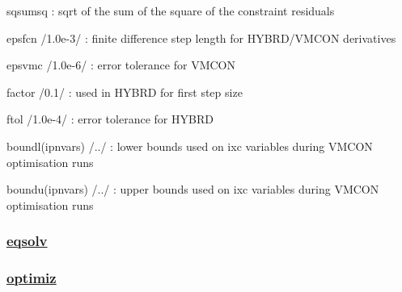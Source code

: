 \documentclass[]{article}
\begin{document}
sqsumsq : sqrt of the sum of the square of the constraint residuals

epsfcn /1.0e-3/ : finite difference step length for HYBRD/VMCON
derivatives

epsvmc /1.0e-6/ : error tolerance for VMCON

factor /0.1/ : used in HYBRD for first step size

ftol /1.0e-4/ : error tolerance for HYBRD

boundl(ipnvars) /../ : lower bounds used on ixc variables during VMCON
optimisation runs

boundu(ipnvars) /../ : upper bounds used on ixc variables during VMCON
optimisation runs

\subsubsection{\texorpdfstring{\href{eqsolv.html}{eqsolv}}{eqsolv}}\label{eqsolv}

\subsubsection{\texorpdfstring{\href{optimiz.html}{optimiz}}{optimiz}}\label{optimiz}
\end{document}
